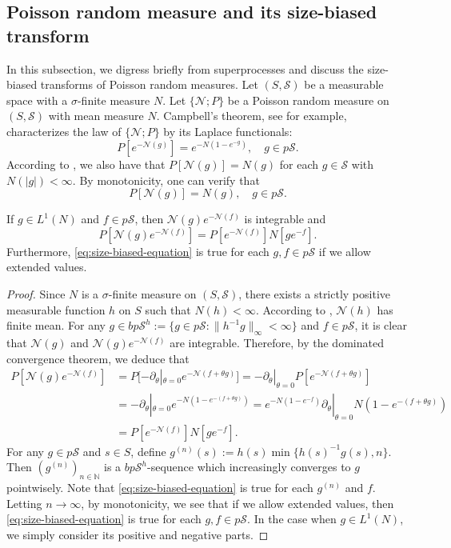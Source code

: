 \subsection{Poisson random measure and its size-biased transform}
	In this subsection, we digress briefly from superprocesses and discuss the size-biased transforms of Poisson random measures.
	Let $(S, \mathscr S)$ be a measurable space with a $\sigma$-finite measure $N$.
	Let $\{\mathcal N; P\}$ be a Poisson random measure on $(S, \mathscr S)$ with mean measure $N$.
	Campbell's theorem, see \cite[Proof of Theorem 2.7]{Kyprianou2014Fluctuations} for example, characterizes the law of $\{ \mathcal N; P \}$ by its Laplace functionals:
\[
	P [e^{-\mathcal N(g)}]
	= e^{-N(1 - e^{-g})},
	\quad g\in p\mathscr S.
\]
	According to \cite[Theorem 2.7]{Kyprianou2014Fluctuations}, we also have that $P [\mathcal N(g)] = N(g)$ for each $g\in \mathscr S$ with $N(|g|) < \infty.$
	By monotonicity, one can verify that
\[
	P [\mathcal N(g)] = N(g),
	\quad g\in p\mathscr S.
\]
\begin{lem}\label{lem:size-biased-lemma}
	If $g\in L^1(N)$ and $ f\in p\mathscr S$, then $\mathcal N(g) e^{-\mathcal N(f)}$ is integrable and
\begin{equation}\label{eq:size-biased-equation}
	P[\mathcal N(g) e^{-\mathcal N(f)}]
	= P[e^{-\mathcal N(f)}] N[g e^{-f}].
\end{equation}
	Furthermore, \eqref{eq:size-biased-equation} is true for each $g,f\in p\mathscr S$ if we allow extended values.	
\end{lem}
\begin{proof}
	Since $N$ is a $\sigma$-finite measure on $(S, \mathscr S)$, there exists a strictly positive measurable function $h$ on $S$ such that $N(h)<\infty$.
	According to \cite[Theorem 2.7.]{Kyprianou2014Fluctuations}, $\mathcal N(h)$ has finite mean.
	For any $g\in bp\mathscr S^h :=\{g\in p\mathscr S: \|h^{-1}g\|_\infty <\infty\}$ and $f\in p\mathscr S$, it is clear that $\mathcal N(g)$ and $\mathcal N(g)e^{-\mathcal N(f)}$ are integrable.
	Therefore, by the dominated convergence theorem, we deduce that
\[\begin{split}
	P[\mathcal N(g) e^{-\mathcal N(f)}]
	&=P[-\partial_\theta|_{\theta=0} e^{-\mathcal N(f+\theta g)}]
	= -\partial_\theta|_{\theta=0} P[e^{-\mathcal N(f+\theta g)}]\\
	&= -\partial_\theta|_{\theta=0} e^{-N(1-e^{-(f+\theta g)})}
	= e^{- N(1-e^{-f})} \partial_\theta|_{\theta=0}N(1-e^{-(f+\theta g)})\\
	&= P[e^{-\mathcal N(f)}]N[ge^{-f}].
\end{split}\]
	For any $g\in p\mathscr S$ and $s\in S$, define $g^{(n)}(s) := h(s) \min\{h(s)^{-1}g(s),n\}$.
	Then $(g^{(n)})_{n\in \mathbb N}$ is a $bp\mathscr S^h$-sequence which increasingly
	converges to $g$ pointwisely.
	Note that \eqref{eq:size-biased-equation} is true for each $g^{(n)}$ and $f$.
	Letting $n\to\infty$, by monotonicity, we see that if we allow extended values, then \eqref{eq:size-biased-equation} is true for each $g,f\in p\mathscr S$.
	In the case when $g\in L^1(N)$, we simply consider its positive and negative parts.
\end{proof}

